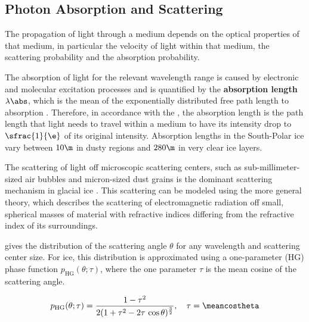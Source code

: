 \subsection{Photon Absorption and Scattering}
\label{sec:scattering}

The propagation of light through a medium depends on the optical properties of that medium, in particular the velocity of light within that medium, the scattering probability and the absorption probability. \cite{lundberg}

The absorption of light for the relevant wavelength range is caused by electronic and molecular excitation processes \cite{lundberg}
and is quantified by the \textbf{absorption length} $\lambda\abs$, which is the mean of the exponentially distributed free path length to absorption \cite{lundberg}.
Therefore, in accordance with the , the absorption length is the path length that light needs to travel within a medium to have its intensity drop to $\sfrac{1}{\e}$ of its original intensity. \cite{lexikonderphysik}
Absorption lengths in the South-Polar ice vary between $10\m$ in dusty regions and $280\m$ in very clear ice layers. \cite{ackermann, ppcpaper, icepaper}

The scattering of light off microscopic scattering centers, such as sub-millimeter-sized air bubbles and micron-sized dust grains \cite{Price1997, ackermann} is the dominant scattering mechanism in glacial ice \cite{Askebjer1997, lundberg}. This scattering can be modeled using the more general  theory, which describes the scattering of electromagnetic radiation off small, spherical masses of material with refractive indices differing from the refractive index of its surroundings. \cite{Mie1908, ackermann, lundberg}

 gives the distribution of the scattering angle $\theta$ for any wavelength and scattering center size. For ice, this distribution is approximated using a one-parameter  (HG) phase function $p_\text{HG}(\theta; \tau)$, where the one parameter $\tau$ is the mean cosine of the scattering angle. \cite{lundberg}

$$ p_\text{HG}(\theta; \tau) = \frac{1 - \tau^2}{2(1 + \tau^2 - 2\tau\, \cos \theta)^\frac{3}{2}}, \ \ \ \tau = \meancostheta $$

